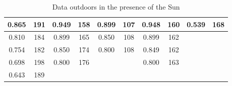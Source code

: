 \begin{table}[H]
{\begin{tabular}{|cc|cc|cc|cc|cc|}
		\multicolumn{1}{|c|}{0.865}          & 191                                & \multicolumn{1}{c|}{0.949}          & 158                               & \multicolumn{1}{c|}{0.899}           & 107                   & \multicolumn{1}{c|}{0.948}      & 160                   & \multicolumn{1}{c|}{0.539}      & 168                   \\ \hline
		\multicolumn{1}{|c|}{0.810}          & 184                                & \multicolumn{1}{c|}{0.899}          & 165                               & \multicolumn{1}{c|}{0.850}           & 108                   & \multicolumn{1}{c|}{0.899}      & 162                   & \multicolumn{1}{c|}{}           &                       \\ \hline
		\multicolumn{1}{|c|}{0.754}          & 182                                & \multicolumn{1}{c|}{0.850}          & 174                               & \multicolumn{1}{c|}{0.800}           & 108                   & \multicolumn{1}{c|}{0.849}      & 162                   & \multicolumn{1}{c|}{}           &                       \\ \hline
		\multicolumn{1}{|c|}{0.698}          & 198                                & \multicolumn{1}{c|}{0.800}          & 176                               & \multicolumn{1}{c|}{}                &                       & \multicolumn{1}{c|}{0.800}      & 163                   & \multicolumn{1}{c|}{}           &                       \\ \hline
		\multicolumn{1}{|c|}{0.643}          & 189                                & \multicolumn{1}{c|}{}               &                                   & \multicolumn{1}{c|}{}                &                       & \multicolumn{1}{c|}{}           &                       & \multicolumn{1}{c|}{}           &                       \\ \hline
	\end{tabular}%
	}
	\caption{Data outdoors in the presence of the Sun}
	\label{tab:outdoor}
\end{table}